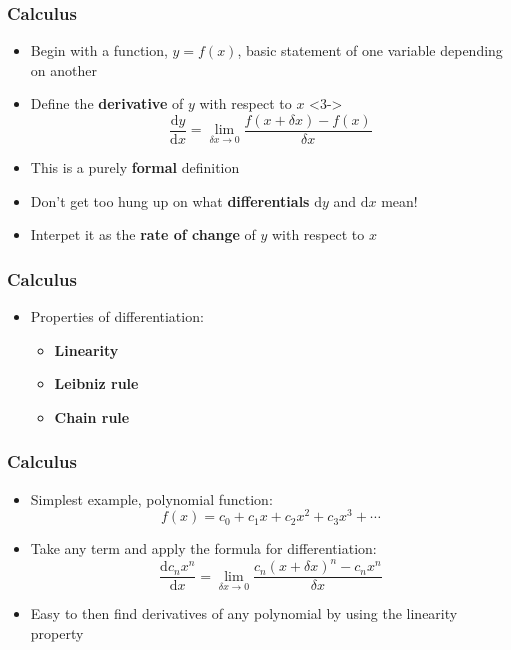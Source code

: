 \documentclass{beamer}
\begin{document}
\begin{frame}
  \frametitle{Calculus}
  \begin{itemize}
    \item<1-> Begin with a function, $y=f(x)$, basic statement of one variable depending on another
    \item<2-> Define the \textbf{derivative} of $y$ with respect to $x$
      <3->\begin{equation*}
	\frac{\mathrm{d}y}{\mathrm{d}x}=\lim_{\delta x\to 0}\frac{f(x+\delta x)-f(x)}{\delta x}
	\label{<+label+>}
      \end{equation*}
    \item<4-> This is a purely \textbf{formal} definition
    \item<5-> Don't get too hung up on what \textbf{differentials} $\mathrm{d}y$ and $\mathrm{d}x$ mean!
    \item<6-> Interpet it as the \textbf{rate of change} of $y$ with respect to $x$
  \end{itemize}
\end{frame}

\begin{frame}
  \frametitle{Calculus}
  \begin{itemize}
    \item<1-> Properties of differentiation:
      \begin{itemize}
	\item<2-> \textbf{Linearity}
	\item<3-> \textbf{Leibniz rule}
	\item<4-> \textbf{Chain rule}
      \end{itemize}
  \end{itemize}
\end{frame}

\begin{frame}
  \frametitle{Calculus}
  \begin{itemize}
    \item<1-> Simplest example, polynomial function:
      \begin{equation*}
	f(x)=c_0+c_1x+c_2x^2+c_3x^3+\cdots
	\label{<+label+>}
      \end{equation*}
    \item<2-> Take any term and apply the formula for differentiation:
      \begin{equation*}
	\frac{\mathrm{d}c_nx^n}{\mathrm{d}x}=\lim_{\delta x\to 0}\frac{c_n(x+\delta x)^n-c_nx^n}{\delta x}
      \end{equation*}
    \item<3-> Easy to then find derivatives of any polynomial by using the linearity property
  \end{itemize}
\end{frame}
\end{document}
